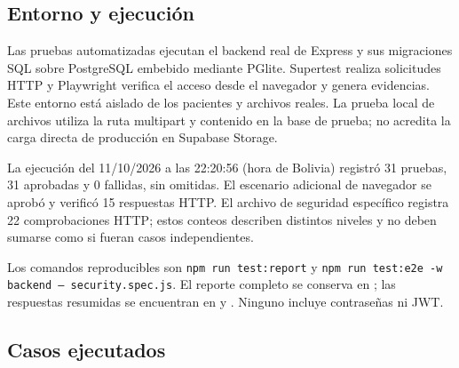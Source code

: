 \documentclass[12pt,letterpaper]{report}
\begin{document}
\subsection{Entorno y ejecución}

Las pruebas automatizadas ejecutan el backend real de Express y sus
migraciones SQL sobre PostgreSQL embebido mediante PGlite. Supertest realiza
solicitudes HTTP y Playwright verifica el acceso desde el navegador y genera
evidencias. Este entorno está aislado de los pacientes y archivos reales.
La prueba local de archivos utiliza la ruta multipart y contenido en la base
de prueba; no acredita la carga directa de producción en Supabase Storage.

La ejecución del 11/10/2026 a las 22:20:56 (hora de Bolivia)
registró 31 pruebas, 31 aprobadas y 0 fallidas, sin omitidas.
El escenario adicional de navegador se aprobó y verificó 15
respuestas HTTP. El archivo de seguridad específico registra 22
comprobaciones HTTP; estos conteos describen distintos niveles y no deben sumarse
como si fueran casos independientes.

Los comandos reproducibles son \texttt{npm run test:report} y
\texttt{npm run test:e2e -w backend -- security.spec.js}.
El reporte completo se conserva en
; las respuestas resumidas se encuentran
en  y
. Ninguno incluye contraseñas ni JWT.

\subsection{Casos ejecutados}
\end{document}
